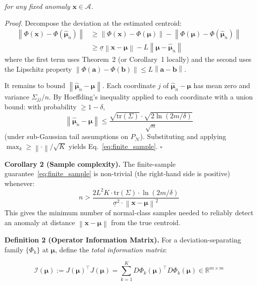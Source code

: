\documentclass[journal]{IEEEtran}
\newcommand{\R}{\mathbb{R}}
\newcommand{\norm}[1]{\left\lVert#1\right\rVert}
\begin{document}
\textit{for any fixed anomaly $\mathbf{x} \in \mathcal{A}$.}

\textit{Proof.} Decompose the deviation at the estimated centroid:
\begin{align*}
\norm{\Phi(\mathbf{x}) - \Phi(\hat{\boldsymbol{\mu}}_n)} &\geq \norm{\Phi(\mathbf{x}) - \Phi(\boldsymbol{\mu})} - \norm{\Phi(\boldsymbol{\mu}) - \Phi(\hat{\boldsymbol{\mu}}_n)} \\
&\geq \underline{\sigma} \norm{\mathbf{x} - \boldsymbol{\mu}} - L \norm{\boldsymbol{\mu} - \hat{\boldsymbol{\mu}}_n}
\end{align*}
where the first term uses Theorem~2 (or Corollary~1 locally) and the second uses the Lipschitz property $\norm{\Phi(\mathbf{a}) - \Phi(\mathbf{b})} \leq L \norm{\mathbf{a} - \mathbf{b}}$.

It remains to bound $\norm{\hat{\boldsymbol{\mu}}_n - \boldsymbol{\mu}}$. Each coordinate $j$ of $\hat{\boldsymbol{\mu}}_n - \boldsymbol{\mu}$ has mean zero and variance $\Sigma_{jj}/n$. By Hoeffding's inequality applied to each coordinate with a union bound: with probability $\geq 1 - \delta$,
$$\norm{\hat{\boldsymbol{\mu}}_n - \boldsymbol{\mu}} \leq \frac{\sqrt{\text{tr}(\Sigma)} \cdot \sqrt{2\ln(2m/\delta)}}{\sqrt{n}}$$
(under sub-Gaussian tail assumptions on $P_{\mathcal{N}}$). Substituting and applying $\max_k \geq \norm{\cdot}/\sqrt{K}$ yields Eq.~\eqref{eq:finite_sample}. $\square$

\textbf{Corollary 2 (Sample complexity).} The finite-sample guarantee~\eqref{eq:finite_sample} is non-trivial (the right-hand side is positive) whenever:
\begin{equation}
n > \frac{2 L^2 K \cdot \text{tr}(\Sigma) \cdot \ln(2m/\delta)}{\underline{\sigma}^2 \cdot \norm{\mathbf{x} - \boldsymbol{\mu}}^2}
\label{eq:sample_complexity}
\end{equation}
This gives the minimum number of normal-class samples needed to reliably detect an anomaly at distance $\norm{\mathbf{x} - \boldsymbol{\mu}}$ from the true centroid.

\vspace{0.5em}

\textbf{Definition 2 (Operator Information Matrix).} For a deviation-separating family $\{\Phi_k\}$ at $\boldsymbol{\mu}$, define the \textit{total information matrix}:

\begin{equation}
\mathcal{I}(\boldsymbol{\mu}) := J(\boldsymbol{\mu})^\top J(\boldsymbol{\mu}) = \sum_{k=1}^{K} D\Phi_k(\boldsymbol{\mu})^\top D\Phi_k(\boldsymbol{\mu}) \in \R^{m \times m}
\label{eq:info_matrix}
\end{equation}
\end{document}
